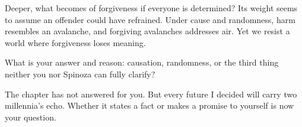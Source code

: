 Deeper, what becomes of forgiveness if everyone is determined? Its weight seems to assume an offender could have refrained. Under cause and randomness, harm resembles an avalanche, and forgiving avalanches addresses air. Yet we resist a world where forgiveness loses meaning.

What is your answer and reason: causation, randomness, or the third thing neither you nor Spinoza can fully clarify?

The chapter has not answered for you. But every future I decided will carry two millennia's echo. Whether it states a fact or makes a promise to yourself is now your question.
